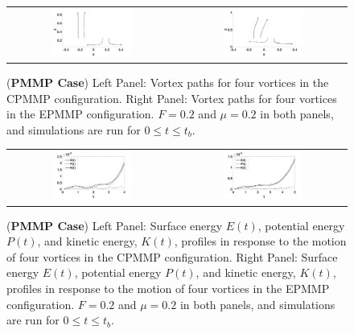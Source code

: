 \documentclass[a4paper,11pt]{article}
\begin{document}
%
\begin{figure}[!h]
\centering
\begin{tabular}{cc}
\includegraphics[width=0.5\textwidth]{tracks_F_pt2_tf_4_pmmp} & 
\includegraphics[width=0.5\textwidth]{tracks_F_pt2_tf_5_pmmp_sym}
\end{tabular}
\caption{\small ({\bf PMMP Case}) Left Panel: Vortex paths for four vortices in the CPMMP configuration.  Right Panel: Vortex paths for four vortices in the EPMMP configuration. $F=0.2$ and $\mu=0.2$ in both panels, and simulations are run for $0\leq t \leq t_{b}$.}
\label{fig:trackpmmp}
\end{figure}

\begin{figure}[!h]
\centering
\begin{tabular}{cc}
\includegraphics[width=0.5\textwidth]{energy_profile_mu_pt2_F_pt2_pmmp} &
\includegraphics[width=0.5\textwidth]{energy_profile_mu_pt2_F_pt2_pmmp_sym}
\end{tabular}
\caption{\small ({\bf PMMP Case}) Left Panel: Surface energy $E(t)$, potential energy $P(t)$, and kinetic energy, $K(t)$, profiles in response to the motion of four vortices in the CPMMP configuration.  Right Panel: Surface energy $E(t)$, potential energy $P(t)$, and kinetic energy, $K(t)$, profiles in response to the motion of four vortices in the EPMMP configuration.  $F=0.2$ and $\mu=0.2$ in both panels, and simulations are run for $0\leq t \leq t_{b}$.}
\label{fig:eprof_pmmp}
\end{figure}
\end{document}
